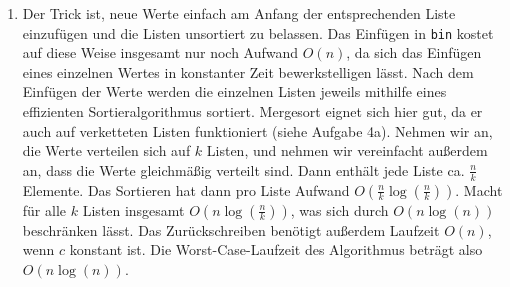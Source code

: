 \documentclass[11pt,a4paper]{article}
\begin{document}
\begin{loesung}
\begin{enumerate}
        \item
        Der Trick ist, neue Werte einfach am Anfang der entsprechenden Liste einzufügen und die Listen unsortiert zu belassen.
        Das Einfügen in \texttt{bin} kostet auf diese Weise insgesamt nur noch Aufwand $O(n)$, da sich das Einfügen eines einzelnen Wertes in konstanter Zeit bewerkstelligen lässt.
        Nach dem Einfügen der Werte werden die einzelnen Listen jeweils mithilfe eines effizienten Sortieralgorithmus sortiert.
        Mergesort eignet sich hier gut, da er auch auf verketteten Listen funktioniert (siehe Aufgabe 4a).
        Nehmen wir an, die Werte verteilen sich auf $k$ Listen, und nehmen wir vereinfacht außerdem an, dass die Werte gleichmäßig verteilt sind.
        Dann enthält jede Liste ca. $\frac{n}{k}$ Elemente.
        Das Sortieren hat dann pro Liste Aufwand $O\left(\frac{n}{k}\log\left(\frac{n}{k}\right)\right)$.
        Macht für alle $k$ Listen insgesamt $O\left(n\log\left(\frac{n}{k}\right)\right)$, was sich durch $O(n \log(n))$ beschränken lässt.
        Das Zurückschreiben benötigt außerdem Laufzeit $O(n)$, wenn $c$ konstant ist.
        Die Worst-Case-Laufzeit des Algorithmus beträgt also $O(n \log(n))$.
    \end{enumerate}
\end{loesung}
\end{document}
